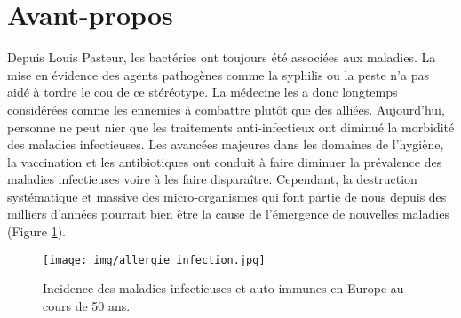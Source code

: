 \documentclass[12pt,a4paper]{article}
\begin{document}
\section{Avant-propos}

Depuis Louis Pasteur, les bactéries ont toujours été associées aux maladies. La mise en évidence des agents pathogènes comme la syphilis ou la peste n'a pas aidé à tordre le cou de ce stéréotype. La médecine les a donc longtemps considérées comme les ennemies à combattre plutôt que des alliées. %
Aujourd'hui, personne ne peut nier que les traitements anti-infectieux ont diminué la morbidité des maladies infectieuses.
Les avancées majeures dans les domaines de l'hygiène, la vaccination et les antibiotiques ont conduit à faire diminuer la prévalence des maladies infectieuses voire à les faire disparaître. Cependant, la destruction systématique et massive des micro-organismes qui font partie de nous depuis des milliers d'années pourrait bien être la cause de l'émergence de nouvelles maladies\cite{Bach2002} (Figure \ref{hyigienisme}).


\begin{figure}[ht]
\begin{center}
\texttt{[image: img/allergie\_infection.jpg]}\hfill
\end{center}
\caption{Incidence des maladies infectieuses et auto-immunes en Europe au cours de 50 ans. }
\label{hyigienisme}
\end{figure}
\end{document}
